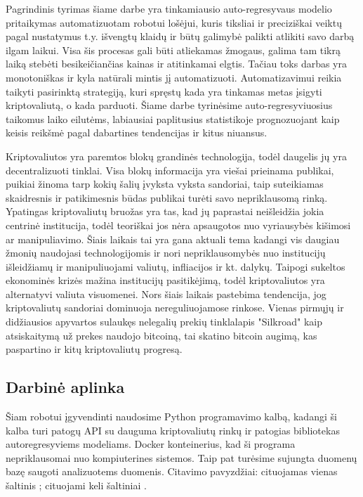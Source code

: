 \documentclass{VUMIFInfKursinis}
\begin{document}
Pagrindinis tyrimas šiame darbe yra tinkamiausio auto-regresyvaus modelio pritaikymas automatizuotam robotui lošėjui, kuris tiksliai ir preciziškai veiktų pagal nustatymus
t.y. išvengtų klaidų ir būtų galimybė palikti atlikiti savo darbą ilgam laikui. Visa šis procesas gali būti atliekamas žmogaus, galima tam tikrą laiką stebėti besikeičiančias
kainas ir atitinkamai elgtis. Tačiau toks darbas yra monotoniškas ir kyla natūrali mintis jį automatizuoti. Automatizavimui reikia taikyti pasirinktą strategiją, kuri spręstų
kada yra tinkamas metas įsigyti kriptovaliutą, o kada parduoti. Šiame darbe tyrinėsime auto-regresyviuosius taikomus laiko eilutėms, labiausiai paplitusius statistikoje
prognozuojant kaip keisis reikšmė pagal dabartines tendencijas ir kitus niuansus.

Kriptovaliutos yra paremtos blokų grandinės technologija, todėl daugelis jų yra decentralizuoti tinklai. Visa blokų informacija yra viešai prieinama publikai, puikiai žinoma
tarp kokių šalių įvyksta vyksta sandoriai, taip suteikiamas skaidresnis ir patikimesnis būdas publikai turėti savo nepriklausomą rinką. Ypatingas kriptovaliutų bruožas yra tas,
kad jų paprastai neišleidžia jokia centrinė institucija, todėl teoriškai jos nėra apsaugotos nuo vyriausybės kišimosi ar manipuliavimo. Šiais laikais tai yra gana aktuali tema
kadangi vis daugiau žmonių naudojasi technologijomis ir nori nepriklausomybės nuo institucijų išleidžiamų ir manipuliuojami valiutų, infliacijos ir kt. dalykų. Taipogi sukeltos
ekonominės krizės mažina institucijų pasitikėjimą, todėl kriptovaliutos yra alternatyvi valiuta visuomenei. Nors šiais laikais pastebima tendencija, jog kriptovaliutų sandoriai
dominuoja nereguliuojamose rinkose. Vienas pirmųjų ir didžiausios apyvartos sulaukęs nelegalių prekių tinklalapis "Silkroad" kaip atsiskaitymą už prekes naudojo bitcoiną, tai
skatino bitcoin augimą, kas paspartino ir kitų kriptovaliutų progresą.

\subsection{Darbinė aplinka}
Šiam robotui įgyvendinti naudosime Python programavimo kalbą, kadangi ši kalba turi patogų API su dauguma kriptovaliutų rinkų ir patogias bibliotekas autoregresyviems modeliams.
Docker konteinerius, kad ši programa nepriklausomai nuo kompiuterines sistemos. Taip pat turėsime sujungta duomenų
bazę saugoti analizuotems duomenis. 
Citavimo pavyzdžiai: cituojamas vienas šaltinis \cite{PvzStraipsnLt}; cituojami
keli šaltiniai \cite{PvzStraipsnEn, PvzKonfLt, PvzKonfEn, PvzKnygLt, PvzKnygEn,
  PvzElPubLt, PvzElPubEn, PvzMagistrLt, PvzPhdEn}.
\end{document}
